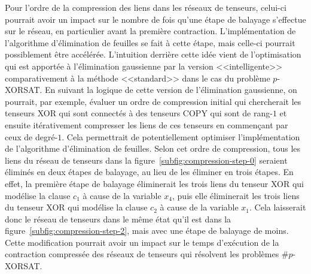 Pour l'ordre de la compression des liens dans les réseaux de tenseurs, celui-ci pourrait avoir un impact sur le nombre de fois qu'une étape de balayage s'effectue sur le réseau, en particulier avant la première contraction.
L'implémentation de l'algorithme d'élimination de feuilles se fait à cette étape, mais celle-ci pourrait possiblement être accélérée.
L'intuition derrière cette idée vient de l'optimisation qui est apportée à l'élimination gaussienne par la version <<intelligente>> comparativement à la méthode <<standard>> dans le cas du problème $p$-XORSAT.
En suivant la logique de cette version de l'élimination gaussienne, on pourrait, par exemple, évaluer un ordre de compression initial qui chercherait les tenseurs XOR qui sont connectés à des tenseurs COPY qui sont de rang-$1$ et ensuite itérativement compresser les liens de ces tenseurs en commençant par ceux de degré-$1$.
Cela permettrait de potentiellement optimiser l'implémentation de l'algorithme d'élimination de feuilles.
Selon cet ordre de compression, tous les liens du réseau de tenseurs dans la figure~\ref{subfig:compression-step-0} seraient éliminés en deux étapes de balayage, au lieu de les éliminer en trois étapes.
En effet, la première étape de balayage éliminerait les trois liens du tenseur XOR qui modélise la clause $c_1$ à cause de la variable $x_4$, puis elle éliminerait les trois liens du tenseur XOR qui modélise la clause $c_2$ à cause de la variable $x_1$.
Cela laisserait donc le réseau de tenseurs dans le même état qu'il est dans la figure~\ref{subfig:compression-step-2}, mais avec une étape de balayage de moins.
Cette modification pourrait avoir un impact sur le temps d'exécution de la contraction compressée des réseaux de tenseurs qui résolvent les problèmes \#$p$-XORSAT.

